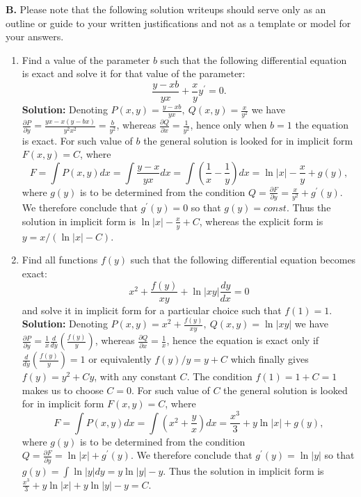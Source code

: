 \documentclass[11pt,a4paper]{article}
\begin{document}
	\textbf{B.} Please note that the following solution writeups should serve only as an outline or guide to your written justifications and not as a template or model for your answers.
	\begin{enumerate}[\bfseries 1)]
		\item Find a value of the parameter $b$ such that the following differential equation is exact and solve it for that value of the parameter:
		$$
		\frac{y-xb}{yx}+\frac{x}{y}y^\prime = 0.
		$$
		\textbf{Solution:} Denoting $P(x,y) = \frac{y-xb}{yx},\ Q(x,y) = \frac{x}{y^2}$ we have $\frac{\partial P}{\partial y} = \frac{yx-x(y-bx)}{y^2x^2} = \frac{b}{y^2}$, whereas $\frac{\partial Q}{\partial x} = \frac{1}{y^2}$, hence only when $b = 1$ the equation is exact. For such value of $b$ the general solution is looked for in implicit form $F(x, y) = C$, where
		$$
		F
		= \int P(x,y)dx
		= \int \frac{y-x}{yx}dx
		= \int \left(\frac{1}{x}-\frac{1}{y}\right)dx
		= \ln |x|-\frac{x}{y}+g(y),
		$$
		where $g(y)$ is to be determined from the condition $Q=\frac{\partial F}{\partial y}=\frac{x}{y^2}+g^\prime (y)$. We therefore conclude that $g^\prime(y) = 0$ so that $g(y) = const$. Thus the solution in implicit form is $\ln |x|-\frac{x}{y}+C$, whereas the explicit form is $y = x/(\ln |x|-C)$.
		\item Find all functions $f(y)$ such that the following differential equation becomes exact:
		$$
		x^2+\frac{f(y)}{xy}+\ln |xy|\frac{dy}{dx} = 0
		$$
		and solve it in implicit form for a particular choice such that $f(1) = 1$.\\
		\textbf{Solution:} Denoting $P(x,y) = x^2+\frac{f(y)}{xy},\ Q(x,y)=\ln |xy|$ we have $\frac{\partial P}{\partial y}=\frac{1}{x}\frac{d}{dy}\left(\frac{f(y)}{y}\right)$, whereas $\frac{\partial Q}{\partial x}=\frac{1}{x}$, hence the equation is exact only if $\frac{d}{dy}\left(\frac{f(y)}{y}\right)=1$ or equivalently $f(y)/y = y + C$ which finally gives $f(y)=y^2+Cy$, with any constant $C$. The condition $f(1) = 1 + C = 1$ makes us to choose $C = 0$. For such value of $C$ the general solution is looked for in implicit form $F(x, y) = C$, where
		$$
		F
		= \int P(x,y)dx
		= \int \left(x^2+\frac{y}{x}\right)dx
		= \frac{x^3}{3}+y\ln |x| +g(y),
		$$
		where $g(y)$ is to be determined from the condition $Q = \frac{\partial F}{\partial y}=\ln |x| + g^\prime (y)$. We therefore conclude that $g^\prime (y) = \ln |y|$ so that $g(y)=\int \ln |y|dy = y\ln |y|-y$.  Thus the solution in implicit form is $\frac{x^3}{3}+y\ln |x| + y\ln |y|-y=C$.
	\end{enumerate}
\end{document}
